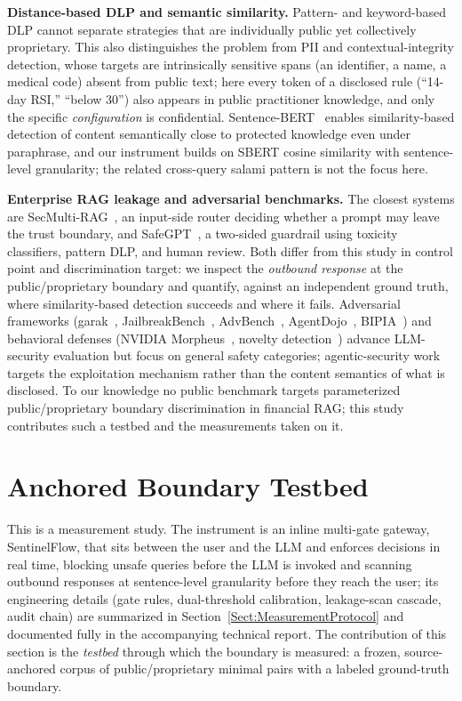 \documentclass[journal]{IEEEtran}
\begin{document}
\textbf{Distance-based DLP and semantic similarity.} Pattern- and keyword-based DLP cannot separate strategies that are individually public yet collectively proprietary. This also distinguishes the problem from PII and contextual-integrity detection, whose targets are intrinsically sensitive spans (an identifier, a name, a medical code) absent from public text; here every token of a disclosed rule (``14-day RSI,'' ``below 30'') also appears in public practitioner knowledge, and only the specific \textit{configuration} is confidential. Sentence-BERT~\cite{sbert} enables similarity-based detection of content semantically close to protected knowledge even under paraphrase, and our instrument builds on SBERT cosine similarity with sentence-level granularity; the related cross-query salami pattern is not the focus here.

\textbf{Enterprise RAG leakage and adversarial benchmarks.} The closest systems are SecMulti-RAG~\cite{secmulti_rag}, an input-side router deciding whether a prompt may leave the trust boundary, and SafeGPT~\cite{safegpt}, a two-sided guardrail using toxicity classifiers, pattern DLP, and human review. Both differ from this study in control point and discrimination target: we inspect the \textit{outbound response} at the public/proprietary boundary and quantify, against an independent ground truth, where similarity-based detection succeeds and where it fails. Adversarial frameworks (garak~\cite{garak_paper, garak_github}, JailbreakBench~\cite{jailbreakbench}, AdvBench~\cite{advbench}, AgentDojo~\cite{agentdojo}, BIPIA~\cite{bipia}) and behavioral defenses (NVIDIA Morpheus~\cite{nvidia_morpheus}, novelty detection~\cite{pimentel_novelty}) advance LLM-security evaluation but focus on general safety categories; agentic-security work~\cite{owasp_agentic_promptfoo, sombra_llm_security_2026, arxiv_privilege_escalation_2025} targets the exploitation mechanism rather than the content semantics of what is disclosed. To our knowledge no public benchmark targets parameterized public/proprietary boundary discrimination in financial RAG; this study contributes such a testbed and the measurements taken on it.

\section{Anchored Boundary Testbed}
\label{Sect:Proposed_Solution}

This is a measurement study. The instrument is an inline multi-gate gateway, SentinelFlow, that sits between the user and the LLM and enforces decisions in real time, blocking unsafe queries before the LLM is invoked and scanning outbound responses at sentence-level granularity before they reach the user; its engineering details (gate rules, dual-threshold calibration, leakage-scan cascade, audit chain) are summarized in Section~\ref{Sect:MeasurementProtocol} and documented fully in the accompanying technical report. The contribution of this section is the \emph{testbed} through which the boundary is measured: a frozen, source-anchored corpus of public/proprietary minimal pairs with a labeled ground-truth boundary.
\end{document}
